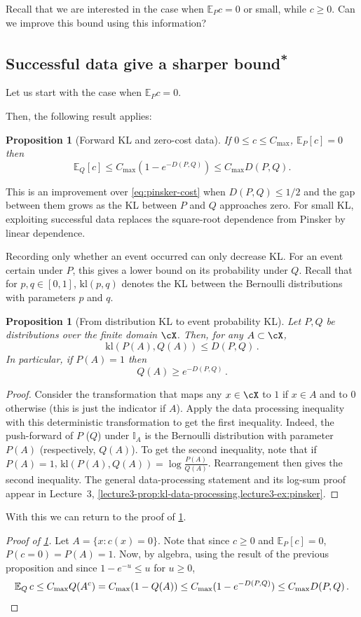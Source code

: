\documentclass[11pt,twoside]{article}
\newcommand{\E}{\mathbb E}
\newcommand{\I}{\mathbb I}
\newcommand{\KL}{D}
\newcommand{\kl}{\mathrm{kl}}
\newcommand{\suppmark}{\texorpdfstring{\textsuperscript{*}}{*}}
\newtheorem{proposition}[theorem]{Proposition}
\theoremstyle{definition}
\theoremstyle{remark}
\begin{document}
Recall that we are interested in the case when $\E_P c=0$ or small, while $c\ge 0$.
Can we improve this bound using this information?

\subsection{Successful data give a sharper bound\suppmark}

Let us start with the case when $\E_P c=0$.




Then, the following result applies:

\begin{proposition}[Forward KL and zero-cost data]
\label{prop:positive-data}
If \(0\le c\le C_{\max}\), \(\E_P[c]=0\)
then
\begin{equation}
 \E_Q[c]\le C_{\max}(1-e^{-\KL(P, Q)})
 \le C_{\max}\KL(P, Q).
 \label{eq:positive-data-bound}
\end{equation}
\end{proposition}
This is an improvement over \cref{eq:pinsker-cost}
when $\KL(P, Q)\le 1/2$ and the gap between them grows as the KL between $P$ and $Q$ approaches zero.
For small KL, exploiting successful data replaces the
square-root dependence from Pinsker by linear dependence.


Recording only whether an event occurred can only decrease KL. For an event certain under \(P\), this gives a lower bound on its probability under \(Q\).
Recall that for $p,q\in [0,1]$, $\kl(p,q)$ denotes the KL between the Bernoulli distributions with parameters $p$ and $q$.
\begin{proposition}[From distribution KL to event probability KL]
Let $P,Q$ be distributions over the finite domain $\cX$.
Then, for any $A\subset \cX$,
\[
\kl(P(A),Q(A))\le \KL(P, Q)\,.
\]
In particular, if $P(A)=1$ then
\[
Q(A) \ge e^{-\KL(P, Q)}\,.
\]
\end{proposition}
\begin{proof}
Consider the transformation that maps
any $x\in \cX$ to $1$ if $x\in A$ and to $0$ otherwise (this is just the indicator if $A$).
Apply the data processing inequality with this deterministic transformation to get the first inequality.
Indeed, the push-forward of $P$ ($Q$) under $\I_A$ is the Bernoulli distribution
with parameter $P(A)$ (respectively, $Q(A)$).
To get the second inequality, note that if $P(A)=1$, $\kl(P(A),Q(A)) = \log \frac{P(A)}{Q(A)}$.
Rearrangement then gives the second inequality. The general data-processing
statement and its log-sum proof appear in Lecture~3,
\cref{lecture3-prop:kl-data-processing,lecture3-ex:pinsker}.
\end{proof}
With this we can return to the proof of \cref{prop:positive-data}.
\begin{proof}[Proof of \cref{prop:positive-data}]
Let \(A=\{x:c(x)=0\}\). Note that since $c\ge 0$ and $\E_P[c]=0$, $P(c=0)=P(A)=1$.
Now, by algebra, using the result of the previous proposition and since $1-e^{-u}\le u$ for $u\ge 0$,
\[
\E_Q \, c
\le
C_{\max} Q(A^c)
=
C_{\max} (1-Q(A)) \le C_{\max}(1-e^{-\KL(P, Q)})
\le C_{\max} \KL(P, Q)
\,. \qedhere
\]
\end{proof}
\end{document}
